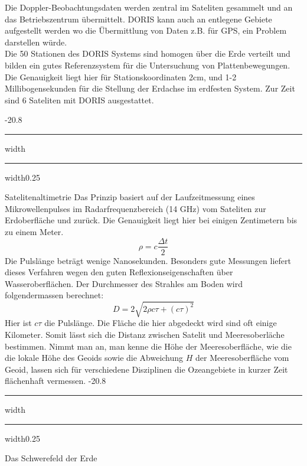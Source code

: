 \documentclass[8pt, landscape, fleqn]{scrartcl}
\makeatletter
\renewcommand{\section}{\@startsection{section}{1}{0mm}%
{-2\baselineskip}{0.8\baselineskip}%
{\hrule depth 0.2pt width\columnwidth\hrule depth1.5pt
width0.25\columnwidth\vspace*{1.2em}\Large\bfseries\rmfamily}}
\renewcommand{\subsection}{\@startsection{subsection}{1}{0mm}%
{-2\baselineskip}{0.8\baselineskip}%
{\hrule depth 0.2pt width\columnwidth\hrule depth0.75pt
width0.25\columnwidth\vspace*{1.2em}\large\bfseries\rmfamily}}
\makeatother
\begin{document}
\begin{multicols*}{3}
Die Doppler-Beobachtungsdaten werden zentral im Sateliten gesammelt und an das Betriebszentrum übermittelt. DORIS kann auch an entlegene Gebiete aufgestellt werden wo die Übermittlung von Daten z.B. für GPS, ein Problem darstellen würde. \\

Die 50 Stationen des DORIS Systems sind homogen über die Erde verteilt und bilden ein gutes Referenzsystem für die Untersuchung von Plattenbewegungen. Die Genauigkeit liegt hier für Stationskoordinaten 2cm, und 1-2 Millibogensekunden für die Stellung der Erdachse im erdfesten System. Zur Zeit sind 6 Sateliten mit DORIS ausgestattet.

\subsection{Satelitenaltimetrie}
Das Prinzip basiert auf der Laufzeitmessung eines Mikrowellenpulses im Radarfrequenzbereich (14 GHz) vom Sateliten zur Erdoberfläche und zurück. Die Genauigkeit liegt hier bei einigen Zentimetern bis zu einem Meter. 
\begin{equation*}
    \rho = c \frac{\Delta t}{2}
\end{equation*}
Die Pulslänge beträgt wenige Nanosekunden. Besonders gute Messungen liefert dieses Verfahren wegen den guten Reflexionseigenschaften über Wasseroberflächen. Der Durchmesser des Strahles am Boden wird folgendermassen berechnet:
\begin{equation*}
    D = 2 \sqrt{2 \rho c \tau + (c\tau)^2}
\end{equation*}
Hier ist $c\tau$ die Pulslänge. Die Fläche die hier abgedeckt wird sind oft einige Kilometer. Somit lässt sich die Distanz zwischen Satelit und Meeresoberläche bestimmen. Nimmt man an, man kenne die Höhe der Meeresoberfläche, wie die die lokale Höhe des Geoids sowie die Abweichung $H$ der Meeresoberfläche vom Geoid, lassen sich für verschiedene Disziplinen die Ozeangebiete in kurzer Zeit flächenhaft vermessen.
\section{Das Schwerefeld der Erde}

\end{multicols*}
\end{document}
